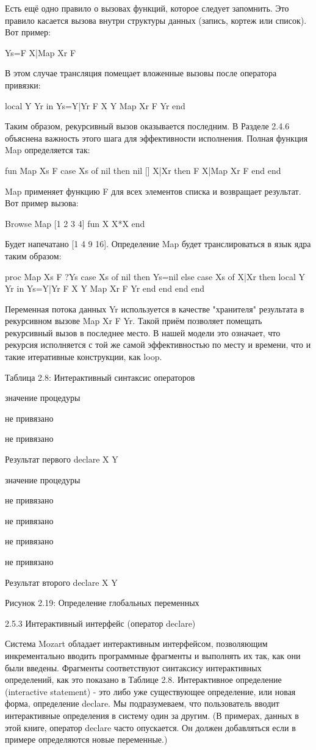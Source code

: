 Есть ещё одно правило о вызовах функций, которое следует запомнить. Это правило касается вызова внутри структуры данных (запись, кортеж или список). Вот пример:

Ys={F X}|{Map Xr F}

В этом случае трансляция помещает вложенные вызовы после оператора привязки:

local Y Yr in
Ys=Y|Yr
{F X Y}
{Map Xr F Yr}
end

Таким образом, рекурсивный вызов оказывается последним. В Разделе 2.4.6 объяснена важность этого шага для эффективности исполнения. Полная функция Map определяется так:

fun {Map Xs F}
case Xs
of nil then nil
[] X|Xr then {F X}|{Map Xr F}
end
end

Map применяет функцию F для всех элементов списка и возвращает результат. Вот пример вызова:

{Browse {Map [1 2 3 4] fun { X} X*X end}}

Будет напечатано [1 4 9 16]. Определение Map будет транслироваться в язык ядра таким образом:

proc {Map Xs F ?Ys}
case Xs of nil then Ys=nil
else case Xs of X|Xr then
local Y Yr in
Ys=Y|Yr
{F X Y}
{Map Xr F Yr}
end
end end
end

Переменная потока данных Yr используется в качестве "хранителя" результата в рекурсивном вызове {Map Xr F Yr}. Такой приём позволяет помещать рекурсивный вызов в последнее место. В нашей модели это означает, что рекурсия исполняется с той же самой эффективностью по месту и времени, что и такие итеративные конструкции, как loop.

Таблица 2.8: Интерактивный синтаксис операторов

значение процедуры

не привязано

не привязано

Результат первого declare X Y

значение процедуры

не привязано

не привязано

не привязано

не привязано

Результат второго declare X Y

Рисунок 2.19: Определение глобальных переменных

2.5.3 Интерактивный интерфейс (оператор declare)

Система Mozart обладает интерактивным интерфейсом, позволяющим инкрементально вводить программные фрагменты и выполнять их так, как они были введены. Фрагменты соответствуют синтаксису интерактивных определений, как это показано в Таблице 2.8. Интерактивное определение (interactive statement) - это либо уже существующее определение, или новая форма, определение declare. Мы подразумеваем, что пользователь вводит интерактивные определения в систему один за другим. (В примерах, данных в этой книге, оператор declare часто опускается. Он должен добавляться если в примере определяются новые переменные.)

